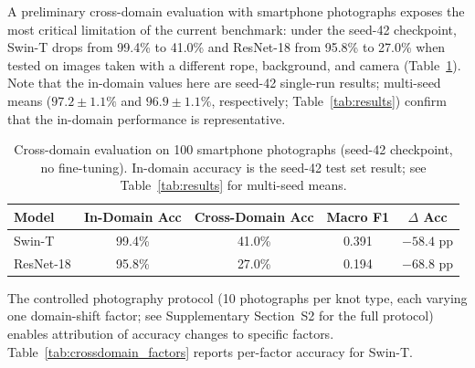 \documentclass[preprint,review,12pt]{elsarticle}
\begin{document}
A preliminary cross-domain evaluation with smartphone photographs exposes the most critical limitation of the current benchmark: under the seed-42 checkpoint, Swin-T drops from 99.4\% to 41.0\% and ResNet-18 from 95.8\% to 27.0\% when tested on images taken with a different rope, background, and camera (Table~\ref{tab:crossdomain_main}). Note that the in-domain values here are seed-42 single-run results; multi-seed means ($97.2 \pm 1.1\%$ and $96.9 \pm 1.1\%$, respectively; Table~\ref{tab:results}) confirm that the in-domain performance is representative.

\begin{table}[t]
\centering
\caption{Cross-domain evaluation on 100 smartphone photographs (seed-42 checkpoint, no fine-tuning). In-domain accuracy is the seed-42 test set result; see Table~\ref{tab:results} for multi-seed means.}
\label{tab:crossdomain_main}
\small
\begin{tabular}{@{}lcccc@{}}
\toprule
Model & In-Domain Acc & Cross-Domain Acc & Macro F1 & $\Delta$ Acc \\
\midrule
Swin-T   & 99.4\% & 41.0\% & 0.391 & $-58.4$ pp \\
ResNet-18 & 95.8\% & 27.0\% & 0.194 & $-68.8$ pp \\
\bottomrule
\end{tabular}
\end{table}

The controlled photography protocol (10 photographs per knot type, each varying one domain-shift factor; see Supplementary Section~S2 for the full protocol) enables attribution of accuracy changes to specific factors. Table~\ref{tab:crossdomain_factors} reports per-factor accuracy for Swin-T.
\end{document}
